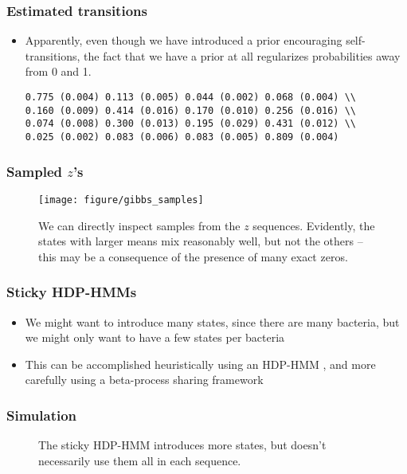 \documentclass{beamer}
\begin{document}
\begin{frame}
  \frametitle{Estimated transitions}
  \begin{itemize}
    \item Apparently, even though we have introduced a prior encouraging
      self-transitions, the fact that we have a prior at all regularizes
      probabilities away from 0 and 1.
\begin{verbatim} 
0.775 (0.004) 0.113 (0.005) 0.044 (0.002) 0.068 (0.004) \\
0.160 (0.009) 0.414 (0.016) 0.170 (0.010) 0.256 (0.016) \\ 
0.074 (0.008) 0.300 (0.013) 0.195 (0.029) 0.431 (0.012) \\
0.025 (0.002) 0.083 (0.006) 0.083 (0.005) 0.809 (0.004) 
\end{verbatim}
  \end{itemize}
\end{frame}

\begin{frame}
  \frametitle{Sampled $z$'s}
\begin{figure}[ht]
  \centering
  \texttt{[image: figure/gibbs\_samples]}
  \caption{We can directly inspect samples from the $z$ sequences. Evidently,
    the states with larger means mix reasonably well, but not the others --
    this may be a consequence of the presence of many exact
    zeros. \label{fig:gibbs_samples} }
\end{figure}
\end{frame}

\begin{frame}
  \frametitle{Sticky HDP-HMMs}
 \begin{itemize}
 \item We might want to introduce many states, since there are many bacteria,
   but we might only want to have a few states per bacteria
 \item This can be accomplished heuristically using an HDP-HMM
   \citep{fox2007sticky}, and more carefully using a beta-process sharing
   framework \citep{fox2009sharing}
 \end{itemize} 
\end{frame}

\begin{frame}
  \frametitle{Simulation}
  \begin{figure}
    \centering
    \qquad
    \caption{The sticky HDP-HMM introduces more states, but doesn't necessarily
      use them all in each sequence.}
    \label{fig:sticky_hdp_hmm}
  \end{figure}
\end{frame}
\end{document}
